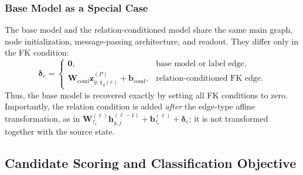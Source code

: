 \documentclass[11pt]{article}
\begin{document}
\subsubsection{Base Model as a Special Case}
\label{sec:base-special-case}

The base model and the relation-conditioned model share the same main graph,
node initialization, message-passing architecture, and readout.  They differ
only in the FK condition:
\begin{equation}
    \boxed{
    \boldsymbol\delta_e
    =
    \begin{cases}
        \mathbf0,
        &
        \text{base model or label edge},\\[1mm]
        \mathbf W_{\mathrm{cond}}
        \mathbf z_{g,\chi_g(e)}^{(P)}
        +
        \mathbf b_{\mathrm{cond}},
        &
        \text{relation-conditioned FK edge}.
    \end{cases}
    }
    \label{eq:base-rel-condition}
\end{equation}
Thus, the base model is recovered exactly by setting all FK conditions to
zero.  Importantly, the relation condition is added \emph{after} the
edge-type affine transformation, as in
\(\mathbf W_{\tau_e}^{(\ell)}\mathbf h_{g,j}^{(\ell-1)}
+\mathbf b_{\tau_e}^{(\ell)}+\boldsymbol\delta_e\); it is not transformed
together with the source state.


\subsection{Candidate Scoring and Classification Objective}
\label{sec:classification-readout}
\end{document}
